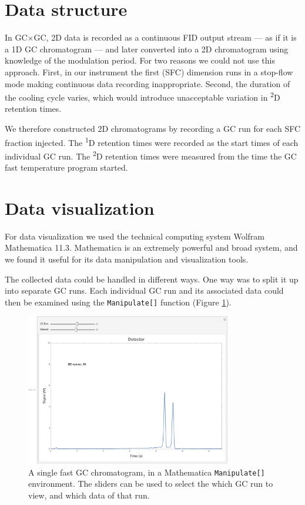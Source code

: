 \section{Data structure}

In GC×GC, 2D data is recorded as a continuous FID output stream --- as if it is
a 1D GC chromatogram --- and later converted into a 2D chromatogram using
knowledge of the modulation period. For two reasons we could not use this
approach. First, in our instrument the first (SFC) dimension runs in a
stop-flow mode making continuous data recording inappropriate. Second, the
duration of the cooling cycle varies, which would introduce unacceptable
variation in \textsuperscript{2}D retention times.

We therefore constructed 2D chromatograms by recording a GC run for each SFC
fraction injected. The \textsuperscript{1}D
retention times were recorded as the start times of each individual GC run.
The \textsuperscript{2}D retention times were measured from
the time the GC fast temperature program started. 

\section{Data visualization}
For data visualization we used the technical computing system Wolfram
Mathematica 11.3\texttrademark{}. Mathematica is an extremely powerful and broad
system, and we found it useful for its data manipulation and visualization
tools.

The collected data could be handled in different ways. One way was to split it
up into separate GC runs. Each individual GC run and its associated data could
then be examined using the \texttt{Manipulate[]} function (Figure
\ref{fig:SingleGC}).

\begin{figure}
	\centering
	\includegraphics[width=0.8\textwidth]{./Figures/Manipulate.pdf}
	\decoRule
	
	\caption[A single fast GC chromatogram ]{A single fast GC chromatogram, in a
	Mathematica \texttt{Manipulate[]} environment. The sliders can be used to select
	the which GC run to view, and which data of that run. }
	
	\label{fig:SingleGC}
\end{figure}

